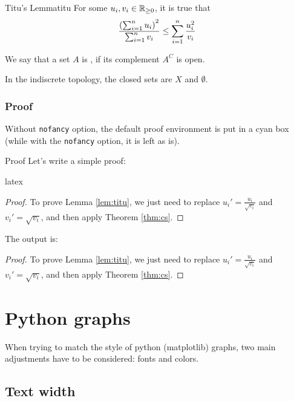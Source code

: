 \documentclass{notes}
\begin{document}
\begin{lem}{Titu's Lemma}{titu}
For some $u_i, v_i \in \mathbb{R}_{\geq 0}$, it is true that
\begin{equation}
    \frac{\left(\sum_{i=1}^n u_i\right)^2}{\sum_{i=1}^n v_i} \leq \sum_{i=1}^n \frac{u_i^2}{v_i}
\end{equation}
\end{lem}

\begin{dfn}{}{}
We say that a set $A$ is , if its complement $A^C$ is open.
\end{dfn}

\begin{exm}{}{}
In the indiscrete topology, the closed sets are $X$ and $\emptyset$.
\end{exm}

\subsubsection{Proof}

Without \texttt{nofancy} option, the default proof environment is put in a cyan box (while with the \texttt{nofancy} option, it is left as is).

\begin{exm}{Proof}{}
Let's write a simple proof:

\begin{tminted}{latex}
\begin{proof}
    To prove Lemma \ref{lem:titu}, we just need to replace $u_i' = \frac{u_i}{\sqrt{v_i}}$ and $v_i' = \sqrt{v_i}$, and then apply Theorem \ref{thm:cs}. 
\end{proof}
\end{tminted}
The output is:
\begin{proof}
To prove Lemma \ref{lem:titu}, we just need to replace $u_i' = \frac{u_i}{\sqrt{v_i}}$ and $v_i' = \sqrt{v_i}$, and then apply Theorem \ref{thm:cs}. 
\end{proof}

\end{exm}

\section{Python graphs}

When trying to match the style of python (matplotlib) graphs, two main adjustments have to be considered: fonts and colors.

\subsection{Text width}
\end{document}
